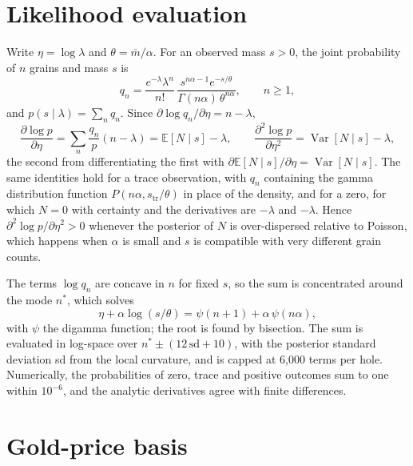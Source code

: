 \documentclass[11pt,a4paper]{article}
\theoremstyle{remark}
\newcommand{\mbar}{\bar m}
\newcommand{\E}{\mathbb{E}}
\newcommand{\Var}{\operatorname{Var}}
\begin{document}
\appendix

\section{Likelihood evaluation}\label{app:lik}

Write $\eta = \log\lambda$ and $\theta = \mbar/\alpha$. For an observed mass $s > 0$, the joint probability of $n$ grains and mass $s$ is
\[
q_n = \frac{e^{-\lambda}\lambda^n}{n!}\,\frac{s^{n\alpha - 1}e^{-s/\theta}}{\Gamma(n\alpha)\,\theta^{n\alpha}},\qquad n \ge 1,
\]
and $p(s \mid \lambda) = \sum_n q_n$. Since $\partial \log q_n/\partial\eta = n - \lambda$,
\[
\frac{\partial \log p}{\partial \eta} = \sum_n \frac{q_n}{p}(n - \lambda) = \E[N \mid s] - \lambda,
\qquad
\frac{\partial^2 \log p}{\partial \eta^2} = \Var[N \mid s] - \lambda,
\]
the second from differentiating the first with $\partial \E[N \mid s]/\partial\eta = \Var[N \mid s]$. The same identities hold for a trace observation, with $q_n$ containing the gamma distribution function $P(n\alpha, s_{\mathrm{tr}}/\theta)$ in place of the density, and for a zero, for which $N = 0$ with certainty and the derivatives are $-\lambda$ and $-\lambda$. Hence $\partial^2\log p/\partial\eta^2 > 0$ whenever the posterior of $N$ is over-dispersed relative to Poisson, which happens when $\alpha$ is small and $s$ is compatible with very different grain counts.

The terms $\log q_n$ are concave in $n$ for fixed $s$, so the sum is concentrated around the mode $n^\ast$, which solves
\[
\eta + \alpha\log(s/\theta) = \psi(n + 1) + \alpha\,\psi(n\alpha),
\]
with $\psi$ the digamma function; the root is found by bisection. The sum is evaluated in log-space over $n^\ast \pm (12\,\mathrm{sd} + 10)$, with the posterior standard deviation sd from the local curvature, and is capped at 6,000 terms per hole. Numerically, the probabilities of zero, trace and positive outcomes sum to one within $10^{-6}$, and the analytic derivatives agree with finite differences.

\section{Gold-price basis}\label{app:price}
\end{document}
